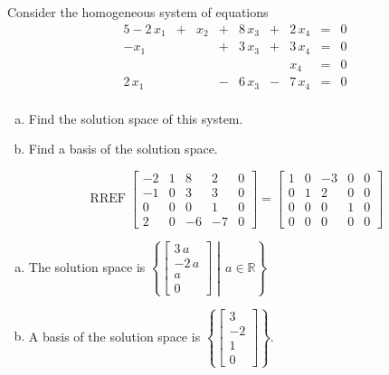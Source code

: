 
\begin{exerciseStatement}


Consider the homogeneous system of equations 
\begin{alignat*}{5} -2 \, x_{1} &+& x_{2} &+& 8 \, x_{3} &+& 2 \, x_{4} &=& 0 \\-x_{1} & &  &+& 3 \, x_{3} &+& 3 \, x_{4} &=& 0 \\ & &  & &  & & x_{4} &=& 0 \\2 \, x_{1} & &  &-& 6 \, x_{3} &-& 7 \, x_{4} &=& 0 \\ \end{alignat*}
            


\begin{enumerate}[(a)]
\item  Find the solution space of this system.
\item  Find a basis of the solution space.
\end{enumerate}
    
\end{exerciseStatement}
    
\begin{exerciseAnswer} 


\[\operatorname{RREF} \left[\begin{array}{cccc|c}
-2 & 1 & 8 & 2 & 0 \\
-1 & 0 & 3 & 3 & 0 \\
0 & 0 & 0 & 1 & 0 \\
2 & 0 & -6 & -7 & 0
\end{array}\right] = \left[\begin{array}{cccc|c}
1 & 0 & -3 & 0 & 0 \\
0 & 1 & 2 & 0 & 0 \\
0 & 0 & 0 & 1 & 0 \\
0 & 0 & 0 & 0 & 0
\end{array}\right] \]


\begin{enumerate}[(a)]
\item The solution space is \( \left\{ \left[\begin{array}{c}
3 \, a \\
-2 \, a \\
a \\
0
\end{array}\right] \middle|\,a\in\mathbb{R}\right\} \)
\item A basis of the solution space is \( \left\{ \left[\begin{array}{c}
3 \\
-2 \\
1 \\
0
\end{array}\right] \right\} \).
\end{enumerate}
    
\end{exerciseAnswer}
    
